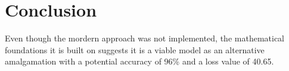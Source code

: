 \chapter{Conclusion}


Even though the mordern approach was not implemented, the mathematical foundations it is built on suggests it is a viable model as an alternative amalgamation with a potential accuracy of 96\% and a loss value of 40.65.